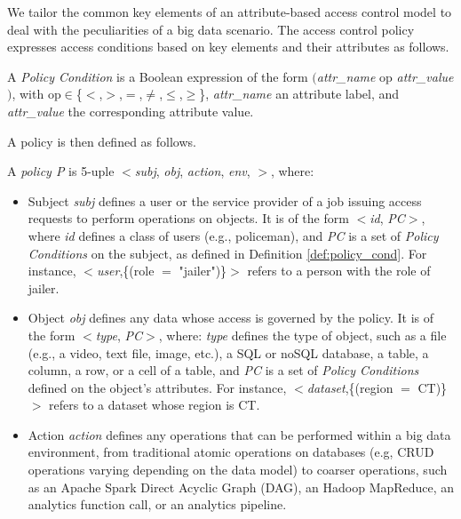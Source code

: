 We tailor the common key elements of an attribute-based access control model to deal with the peculiarities of a big data scenario. The access control policy expresses access conditions based on key elements and their attributes as follows.

\begin{definition}\label{def:policy_cond}
  A \emph{Policy Condition} is a Boolean expression of the form $($\emph{attr\_name} op \emph{attr\_value}$)$, with op$\in$\{$<$,$>$,$=$,$\neq$,$\leq$,$\geq$\}, \emph{attr\_name} an attribute label, and \emph{attr\_value} the corresponding attribute value.
\end{definition}

A policy is then defined as follows.

\begin{definition}[Policy]\label{def:policy_rule}
  A {\it policy P} is 5-uple $<$\textit{subj}, \textit{obj}, \textit{action}, \textit{env}, \textit{\TF}$>$, where:
  \begin{itemize}
    \item Subject \textit{subj} defines a user or the service provider of a job issuing access requests to perform operations on objects.
          It is of the form $<$\emph{id}, \emph{PC}$>$, where \emph{id} defines a class of users (e.g., policeman), and \emph{PC} is a set of \emph{Policy Conditions} on the subject, as defined in Definition \ref{def:policy_cond}.
          For instance, $<$\emph{user},\{(role $=$ "jailer")\}$>$ refers to a person with the role of jailer.

    \item Object \textit{obj} defines any data whose access is governed by the policy.
          It is of the form $<$\emph{type}, \emph{PC}$>$, where: \emph{type} defines the type of object, such as a file (e.g., a video, text file, image, etc.), a SQL or noSQL database, a table, a column, a row, or a cell of a table, and \emph{PC} is a set of \emph{Policy Conditions} defined on the object's attributes.
          For instance, $<$\emph{dataset},\{(region $=$ CT)\}$>$ refers to a dataset whose region is CT.

    \item Action \textit{action} defines any operations that can be performed within a big data environment, from traditional atomic operations on databases (e.g, CRUD operations varying depending on the data model) to coarser operations, such as an Apache Spark Direct Acyclic Graph (DAG), an Hadoop MapReduce, an analytics function call, or an analytics pipeline.


\end{itemize}
\end{definition}
